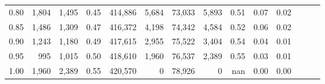 \begin{tabular}{rrrrrrrrrrrrrr}
0.80 &   1,804 &  1,495 &  0.45 &  414,886 &    5,684 &  73,033 &   5,893 &  0.51 &  0.07 &      0.02 \\
0.85 &   1,486 &  1,309 &  0.47 &  416,372 &    4,198 &  74,342 &   4,584 &  0.52 &  0.06 &      0.02 \\
0.90 &   1,243 &  1,180 &  0.49 &  417,615 &    2,955 &  75,522 &   3,404 &  0.54 &  0.04 &      0.01 \\
0.95 &     995 &  1,015 &  0.50 &  418,610 &    1,960 &  76,537 &   2,389 &  0.55 &  0.03 &      0.01 \\
1.00 &   1,960 &  2,389 &  0.55 &  420,570 &        0 &  78,926 &       0 &   nan &  0.00 &      0.00 \\
\bottomrule
\end{tabular}
